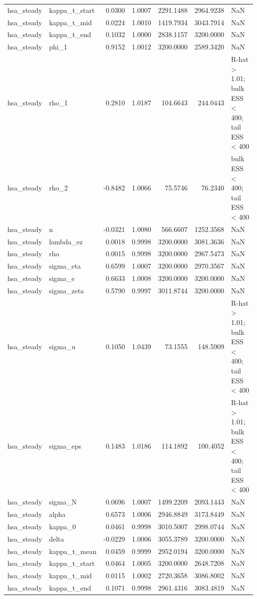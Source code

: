 \begin{tabular}{llrrrrl}
hsa\_steady & kappa\_t\_start & 0.0300 & 1.0007 & 2291.1488 & 2964.9238 & NaN \\
hsa\_steady & kappa\_t\_mid & 0.0224 & 1.0010 & 1419.7934 & 3043.7914 & NaN \\
hsa\_steady & kappa\_t\_end & 0.1032 & 1.0000 & 2838.1157 & 3200.0000 & NaN \\
hsa\_steady & phi\_1 & 0.9152 & 1.0012 & 3200.0000 & 2589.3420 & NaN \\
hsa\_steady & rho\_1 & 0.2810 & 1.0187 & 104.6643 & 244.0443 & R-hat > 1.01; bulk ESS < 400; tail ESS < 400 \\
hsa\_steady & rho\_2 & -0.8482 & 1.0066 & 75.5746 & 76.2340 & bulk ESS < 400; tail ESS < 400 \\
hsa\_steady & n & -0.0321 & 1.0080 & 566.6607 & 1252.3568 & NaN \\
hsa\_steady & lambda\_ez & 0.0018 & 0.9998 & 3200.0000 & 3081.3636 & NaN \\
hsa\_steady & rho & 0.0015 & 0.9998 & 3200.0000 & 2967.5473 & NaN \\
hsa\_steady & sigma\_eta & 0.6599 & 1.0007 & 3200.0000 & 2970.3567 & NaN \\
hsa\_steady & sigma\_e & 0.6633 & 1.0008 & 3200.0000 & 3200.0000 & NaN \\
hsa\_steady & sigma\_zeta & 0.5790 & 0.9997 & 3011.8744 & 3200.0000 & NaN \\
hsa\_steady & sigma\_u & 0.1050 & 1.0439 & 73.1555 & 148.5909 & R-hat > 1.01; bulk ESS < 400; tail ESS < 400 \\
hsa\_steady & sigma\_eps & 0.1483 & 1.0186 & 114.1892 & 100.4052 & R-hat > 1.01; bulk ESS < 400; tail ESS < 400 \\
hsa\_steady & sigma\_N & 0.0696 & 1.0007 & 1499.2209 & 2093.1443 & NaN \\
hsa\_steady & alpha & 0.6573 & 1.0006 & 2946.8849 & 3173.8449 & NaN \\
hsa\_steady & kappa\_0 & 0.0461 & 0.9998 & 3010.5007 & 2998.0744 & NaN \\
hsa\_steady & delta & -0.0229 & 1.0006 & 3055.3789 & 3200.0000 & NaN \\
hsa\_steady & kappa\_t\_mean & 0.0459 & 0.9999 & 2952.0194 & 3200.0000 & NaN \\
hsa\_steady & kappa\_t\_start & 0.0464 & 1.0005 & 3200.0000 & 2648.7208 & NaN \\
hsa\_steady & kappa\_t\_mid & 0.0115 & 1.0002 & 2720.3658 & 3086.8002 & NaN \\
hsa\_steady & kappa\_t\_end & 0.1071 & 0.9998 & 2961.4316 & 3083.4819 & NaN \\

\end{tabular}
